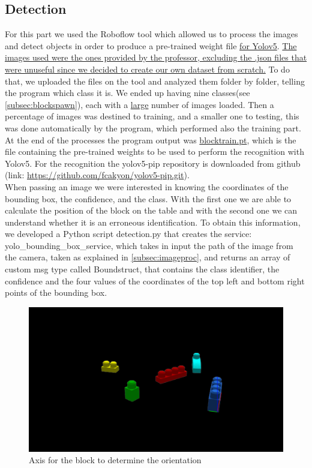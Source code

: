 \documentclass[12pt,a4paper]{article}
\begin{document}
\subsection{Detection}\label{subsec:detect}
For this part we used the Roboflow tool which allowed us to process the images and detect objects in order to produce a pre-trained weight file \uline{for Yolov5}. \uline{The images used were the ones provided by the professor, excluding the .json files that were unuseful since we decided to create our own dataset from scratch.} To do that, we uploaded the files on the tool and analyzed them folder by folder, telling the program which class it is. We ended up having nine classes(see \ref{subsec:blockspawn}), each with a \uline{large} number of images loaded. Then a percentage of images was destined to training, and a smaller one to testing, this was done automatically by the program, which performed also the training part. At the end of the processes the program output was \uline{blocktrain.pt}, which is the file containing the pre-trained weights to be used to perform the recognition with Yolov5. 
For the recognition the yolov5-pip repository is downloaded from github (link: \url{https://github.com/fcakyon/yolov5-pip.git}).\\
When passing an image we were interested in knowing the coordinates of the bounding box, the confidence, and the class. With the first one we are able to calculate the position of the block on the table and with the second one we can understand whether it is an erroneous identification. To obtain this information, we developed a Python script detection.py that creates the service: yolo\_bounding\_box\_service, which takes in input the path of the image from the camera, taken as explained in \ref{subsec:imageproc}, and returns an array of custom msg type called Boundstruct, that contains the class identifier, the confidence and the four values of the coordinates of the top left and bottom right points of the bounding box.
\begin{center}
    \begin{figure}
        \centering
        \includegraphics[width=1.0\columnwidth]{images/Obj1.png}
        \caption{Axis for the block to determine the orientation}
        \label{fig:obj1}
    \end{figure}
\end{center}
\end{document}
